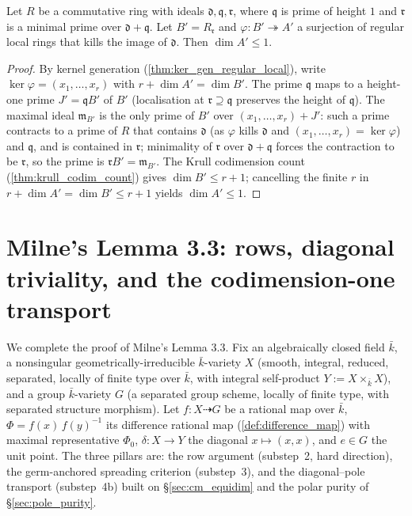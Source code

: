 \begin{theorem}
  \label{thm:transport_codim_count}
  \leanok
  Let \(R\) be a commutative ring with ideals \(\mathfrak d, \mathfrak q,
  \mathfrak r\), where \(\mathfrak q\) is prime of height \(1\) and \(\mathfrak r\)
  is a minimal prime over \(\mathfrak d + \mathfrak q\). Let
  \(B' = R_{\mathfrak r}\) and \(\varphi : B' \twoheadrightarrow A'\) a surjection
  of regular local rings that kills the image of \(\mathfrak d\). Then
  \(\dim A' \le 1\).
\end{theorem}
\begin{proof}
  \leanok
  By kernel generation (\ref{thm:ker_gen_regular_local}), write
  \(\ker\varphi = (x_1, \dots, x_r)\) with \(r + \dim A' = \dim B'\). The prime
  \(\mathfrak q\) maps to a height-one prime \(J' = \mathfrak q B'\) of \(B'\)
  (localisation at \(\mathfrak r \supseteq \mathfrak q\) preserves the height of
  \(\mathfrak q\)). The maximal ideal \(\mathfrak m_{B'}\) is the only prime of
  \(B'\) over \((x_1, \dots, x_r) + J'\): such a prime contracts to a prime of
  \(R\) that contains \(\mathfrak d\) (as \(\varphi\) kills \(\mathfrak d\) and
  \((x_1, \dots, x_r) = \ker\varphi\)) and \(\mathfrak q\), and is contained in
  \(\mathfrak r\); minimality of \(\mathfrak r\) over \(\mathfrak d + \mathfrak q\)
  forces the contraction to be \(\mathfrak r\), so the prime is
  \(\mathfrak r B' = \mathfrak m_{B'}\). The Krull codimension count
  (\ref{thm:krull_codim_count}) gives \(\dim B' \le r + 1\); cancelling the
  finite \(r\) in \(r + \dim A' = \dim B' \le r + 1\) yields \(\dim A' \le 1\).
\end{proof}

\section{Milne's Lemma 3.3: rows, diagonal triviality, and the codimension-one
  transport}
\label{sec:milne33_transport}

We complete the proof of Milne's Lemma 3.3. Fix an algebraically closed field
\(\bar k\), a nonsingular geometrically-irreducible \(\bar k\)-variety \(X\)
(smooth, integral, reduced, separated, locally of finite type over \(\bar k\),
with integral self-product \(Y := X \times_{\bar k} X\)), and a group
\(\bar k\)-variety \(G\) (a separated group scheme, locally of finite type, with
separated structure morphism). Let \(f : X \dashrightarrow G\) be a rational map
over \(\bar k\), \(\Phi = f(x)\,f(y)^{-1}\) its difference rational map
(\ref{def:difference_map}) with maximal representative \(\Phi_0\),
\(\delta : X \to Y\) the diagonal \(x \mapsto (x, x)\), and \(e \in G\) the unit
point. The three pillars are: the row argument (substep~2, hard direction), the
germ-anchored spreading criterion (substep~3), and the diagonal--pole transport
(substep~4b) built on \S\ref{sec:cm_equidim} and the polar purity of
\S\ref{sec:pole_purity}.

